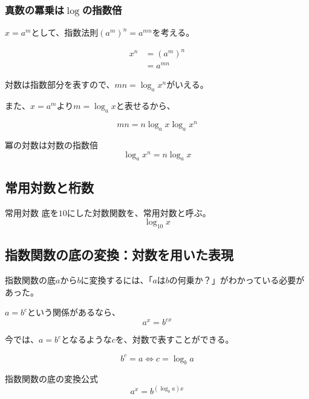 \documentclass[../../imaging-math]{subfiles}
\begin{document}
\subsubsection{真数の冪乗は$\log$の指数倍}

$x = a^m$として、指数法則$(a^m)^n = a^{mn}$を考える。

\begin{align}
  x^n & = (a^m)^n \\
      & = a^{mn}
\end{align}

対数は指数部分を表すので、$mn = \log_a x^n$がいえる。

また、$x = a^m$より$m = \log_a x$と表せるから、

\begin{equation}
  mn = n \log_a x \log_a x^n
\end{equation}

\begin{theorem}{冪の対数は対数の指数倍}
  \LARGE
  \begin{equation}
    \log_a x^n = n \log_a x
  \end{equation}
\end{theorem}

\subsection{常用対数と桁数}

\wip

\begin{definition}{常用対数}
  底を$10$にした対数関数を、常用対数と呼ぶ。
  \LARGE
  \begin{equation}
    \log_{10} x
  \end{equation}
\end{definition}

\subsection{指数関数の底の変換：対数を用いた表現}

指数関数の底$a$から$b$に変換するには、「$a$は$b$の何乗か？」がわかっている必要があった。

\begin{review}
  $a=b^c$という関係があるなら、
  \begin{equation}
    a^x = b^{cx}
  \end{equation}
\end{review}

今では、$a= b^c$となるような$c$を、対数で表すことができる。

\begin{equation}
  b^c = a \Longleftrightarrow  c = \log_b a
\end{equation}

\begin{theorem}{指数関数の底の変換公式}
  \LARGE
  \begin{equation}
    a^x = b^{(\log_b a)x}
  \end{equation}
\end{theorem}
\end{document}
